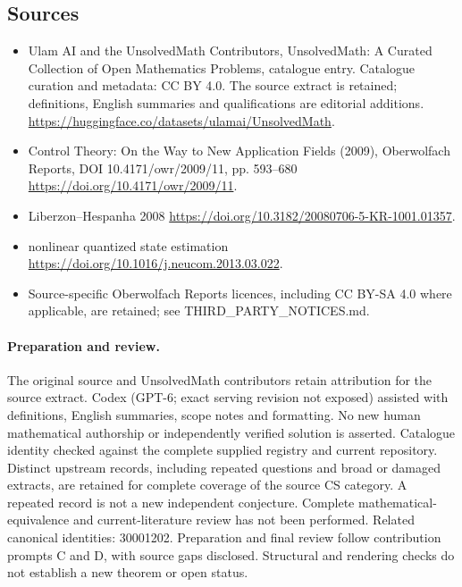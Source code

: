 \documentclass[11pt]{article}
\begin{document}
\subsection{Sources}
\begin{itemize}
\item[S1] Ulam AI and the UnsolvedMath Contributors, UnsolvedMath: A Curated Collection of Open Mathematics Problems, catalogue entry. Catalogue curation and metadata: CC BY 4.0. The source extract is retained; definitions, English summaries and qualifications are editorial additions.
\url{https://huggingface.co/datasets/ulamai/UnsolvedMath}.
\item[S2] Control Theory: On the Way to New Application Fields (2009), Oberwolfach Reports, DOI 10.4171/owr/2009/11, pp. 593--680
\url{https://doi.org/10.4171/owr/2009/11}.
\item[S3] Liberzon--Hespanha 2008
\url{https://doi.org/10.3182/20080706-5-KR-1001.01357}.
\item[S4] nonlinear quantized state estimation
\url{https://doi.org/10.1016/j.neucom.2013.03.022}.
\item Source-specific Oberwolfach Reports licences, including CC BY-SA 4.0 where applicable, are retained; see THIRD\_PARTY\_NOTICES.md.
\end{itemize}
\paragraph{Preparation and review.}
The original source and UnsolvedMath contributors retain attribution for the source extract. Codex (GPT-6; exact serving revision not exposed) assisted with definitions, English summaries, scope notes and formatting. No new human mathematical authorship or independently verified solution is asserted. Catalogue identity checked against the complete supplied registry and current repository. Distinct upstream records, including repeated questions and broad or damaged extracts, are retained for complete coverage of the source CS category. A repeated record is not a new independent conjecture. Complete mathematical-equivalence and current-literature review has not been performed. Related canonical identities: 30001202. Preparation and final review follow contribution prompts C and D, with source gaps disclosed. Structural and rendering checks do not establish a new theorem or open status.
\label{end:statement}
\end{document}
